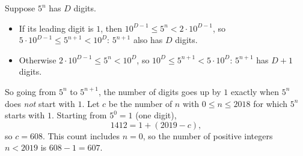 Suppose $5^n$ has $D$ digits.
\begin{itemize}
\item If its leading digit is $1$, then $10^{D-1}\le5^n<2\cdot10^{D-1}$, so $5\cdot10^{D-1}\le5^{n+1}<10^D$: $5^{n+1}$ also has $D$ digits.
\item Otherwise $2\cdot10^{D-1}\le5^n<10^D$, so $10^D\le5^{n+1}<5\cdot10^D$: $5^{n+1}$ has $D+1$ digits.
\end{itemize}
So going from $5^n$ to $5^{n+1}$, the number of digits goes up by $1$ exactly when $5^n$ does \emph{not} start with $1$. Let $c$ be the number of $n$ with $0\le n\le2018$ for which $5^n$ starts with $1$. Starting from $5^0=1$ (one digit),
\[1412=1+(2019-c),\]
so $c=608$. This count includes $n=0$, so the number of positive integers $n<2019$ is $608-1=\boxed{607}$.
